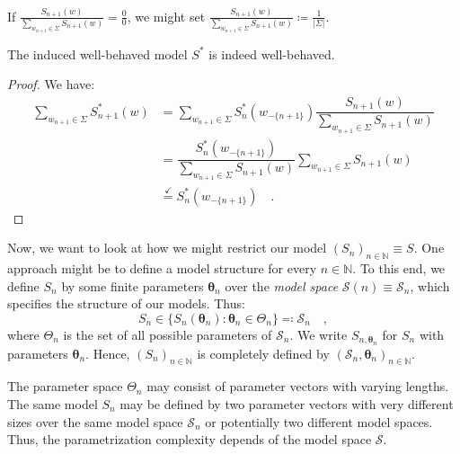 \documentclass[../../main.tex]{subfiles}
\begin{document}
    \begin{remark}
        If $\frac{S_{n+1}(w)}{\sum_{w_{n+1} \in \Sigma} S_{n+1}(w)} = \frac{0}{0}$, we might set $\frac{S_{n+1}(w)}{\sum_{w_{n+1} \in \Sigma} S_{n+1}(w)} \coloneqq \frac{1}{|\Sigma|}$.
    \end{remark}

    \begin{lemma}
        The induced well-behaved model $S^*$ is indeed well-behaved.
    \end{lemma}
    \vspace{-2.5em}
    \begin{proof}
        We have:
        \begin{align*}
            \sum_{w_{n + 1} \in \Sigma} S_{n + 1}^*(w) &= \sum_{w_{n + 1} \in \Sigma} S_n^*(w_{-\{n+1\}}) \dfrac{S_{n+1}(w)}{\sum_{w_{n+1} \in \Sigma} S_{n+1}(w)} \\
            &= \dfrac{S_n^*(w_{-\{n+1\}})}{\sum_{w_{n+1} \in \Sigma} S_{n+1}(w)} \sum_{w_{n + 1} \in \Sigma} S_{n+1}(w) \\
            &\overset{\checkmark}{=} S_n^*(w_{-\{n+1\}}) \quad .
        \end{align*}
    \end{proof}

    Now, we want to look at how we might restrict our model $(S_n)_{n \in \mathbb{N}} \equiv S$. One approach might be to define a model structure for every $n \in \mathbb{N}$. To this end, we define $S_n$ by some finite parameters $\bm{\theta}_n$ over the \emph{model space} $\mathcal{S}(n) \equiv \mathcal{S}_n$, which specifies the structure of our models. Thus:
    \[
        S_n \in \{ S_n(\bm{\theta}_n) : \bm{\theta}_n \in \Theta_n \} \eqqcolon \mathcal{S}_n \quad ,
    \]
    where $\Theta_n$ is the set of all possible parameters of $\mathcal{S}_n$. We write $S_{n, \bm{\theta}_n}$ for $S_n$ with parameters $\bm{\theta}_n$. Hence, $(S_n)_{n \in \mathbb{N}}$ is completely defined by $(\mathcal{S}_n, \bm{\theta}_n)_{n \in \mathbb{N}}$.

    \begin{remark}
        The parameter space $\Theta_n$ may consist of parameter vectors with varying lengths. The same model $S_n$ may be defined by two parameter vectors with very different sizes over the same model space $\mathcal{S}_n$ or potentially two different model spaces. Thus, the parametrization complexity depends of the model space $\mathcal{S}$.
    \end{remark}
\end{document}
